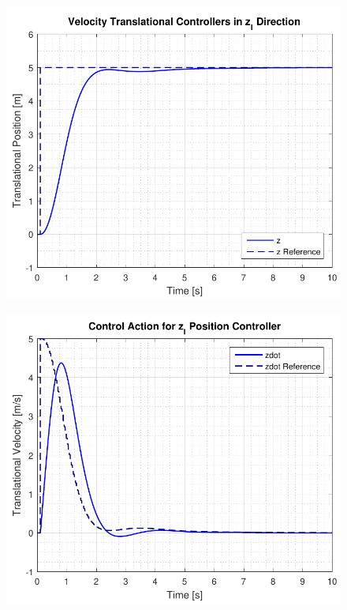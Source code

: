 \begin{minipage}{\linewidth}
\begin{minipage}{0.45\linewidth}
\begin{figure}[H]
            \centering
            \label{fig:velocityControllerZAction}
        \end{figure}
    \end{minipage}
\end{minipage}


\begin{minipage}{\linewidth}
    \begin{minipage}{0.45\linewidth}
        \begin{figure}[H]
            \includegraphics[scale=.55]{figures/positionControllerZ}
            \centering			
            \label{fig:positionControllersZ}
        \end{figure}
    \end{minipage}
    \hspace{0.03\linewidth}
    \begin{minipage}{0.45\linewidth}
        \begin{figure}[H]
            \includegraphics[scale=.55]{figures/positionControllerZAction}

\end{figure}
\end{minipage}
\end{minipage}
